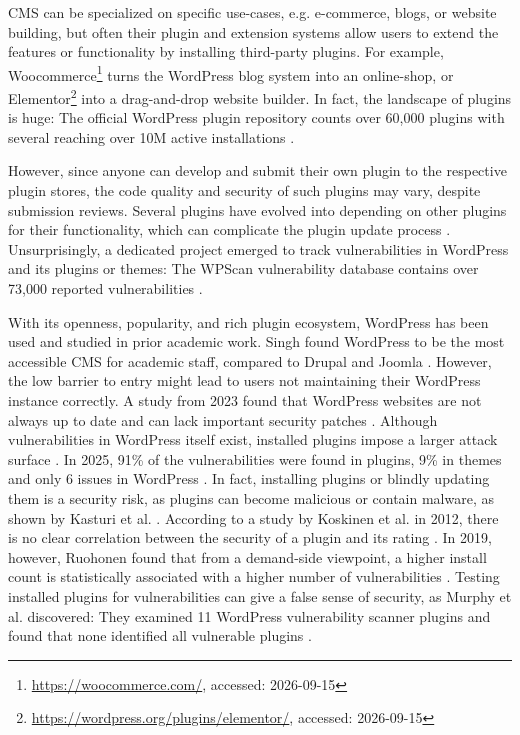 \documentclass[sigconf]{acmart}
\begin{document}
CMS can be specialized on specific use-cases, e.g. e-commerce, blogs, or website building, but often their plugin and extension systems allow users to extend the features or functionality by installing third-party plugins.
For example, Woocommerce\footnote{\url{https://woocommerce.com/}, accessed: 2026-09-15} turns the WordPress blog system into an online-shop, or Elementor\footnote{\url{https://wordpress.org/plugins/elementor/}, accessed: 2026-09-15} into a drag-and-drop website builder. 
In fact, the landscape of plugins is huge: The official WordPress plugin repository counts over 60,000 plugins with several reaching over 10M active installations \cite{wpodysseyManyWordPress}.

However, since anyone can develop and submit their own plugin to the respective plugin stores, the code quality and security of such plugins may vary, despite submission reviews.
Several plugins have evolved into depending on other plugins for their functionality, which can complicate the plugin update process \cite{coevolution}.
Unsurprisingly, a dedicated project emerged to track vulnerabilities in WordPress and its plugins or themes: 
The WPScan vulnerability database contains over 73,000 reported vulnerabilities \cite{wpscan2026statistics}. 

With its openness, popularity, and rich plugin ecosystem, WordPress has been used and studied in prior academic work. 
Singh found WordPress to be the most accessible CMS for academic staff, compared to Drupal and Joomla \cite{singhcomparative}.
However, the low barrier to entry might lead to users not maintaining their WordPress instance correctly. 
A study from 2023 found that WordPress websites are not always up to date and can lack important security patches \cite{ekstam2023vulnerabilities}.
Although vulnerabilities in WordPress itself exist, installed plugins impose a larger attack surface \cite{kabata2025analysis}.
In 2025, 91\% of the vulnerabilities were found in plugins, 9\% in themes and only 6 issues in WordPress \cite{patchstackStateWordPress}.
In fact, installing plugins or blindly updating them is a security risk, as plugins can become malicious or contain malware, as shown by Kasturi et al. \cite{mistrust}.
According to a study by Koskinen et al. in 2012, there is no clear correlation between the security of a plugin and its rating \cite{qualityofWPplugins}. 
In 2019, however, Ruohonen found that from a demand-side viewpoint, a higher install count is statistically associated with a higher number of vulnerabilities \cite{10.1145/3319008.3319029}.
Testing installed plugins for vulnerabilities can give a false sense of security, as Murphy et al. discovered: They examined 11 WordPress vulnerability scanner plugins and found that none identified all vulnerable plugins \cite{9509274}.
\end{document}
